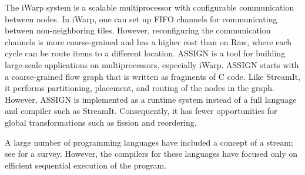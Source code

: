 The iWarp system \cite{iwarp} is a scalable multiprocessor with
configurable communication between nodes.  In iWarp, one can set up
FIFO channels for communicating between non-neighboring tiles.
However, reconfiguring the communication channels is more
coarse-grained and has a higher cost than on Raw, where each cycle can
be route items to a different location.  ASSIGN \cite{assign} is a
tool for building large-scale applications on multiprocessors,
especially iWarp.  ASSIGN starts with a coarse-grained flow graph that
is written as fragments of C code.  Like StreamIt, it performs
partitioning, placement, and routing of the nodes in the graph.
However, ASSIGN is implemented as a runtime system instead of a full
language and compiler such as StreamIt.  Consequently, it has fewer
opportunities for global transformations such as fission and
reordering.

A large number of programming languages have included a concept of a
stream; see \cite{survey97} for a survey. However, the compilers for
these languages have focused only on efficient sequential execution of
the program.
